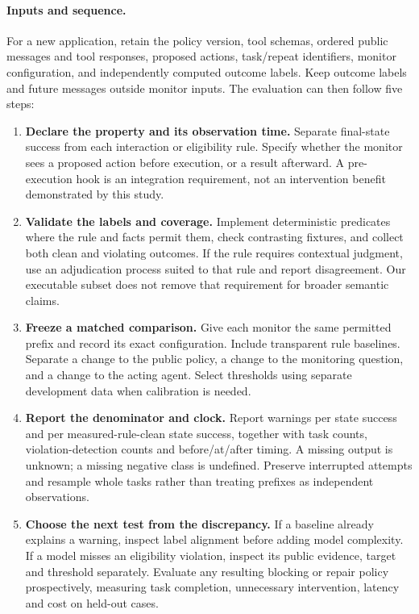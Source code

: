 \paragraph{Inputs and sequence.}
For a new application, retain the policy version, tool schemas, ordered public messages and tool responses, proposed actions, task/repeat identifiers, monitor configuration, and independently computed outcome labels. Keep outcome labels and future messages outside monitor inputs. The evaluation can then follow five steps:
\begin{enumerate}
\item \textbf{Declare the property and its observation time.} Separate final-state success from each interaction or eligibility rule. Specify whether the monitor sees a proposed action before execution, or a result afterward. A pre-execution hook is an integration requirement, not an intervention benefit demonstrated by this study.
\item \textbf{Validate the labels and coverage.} Implement deterministic predicates where the rule and facts permit them, check contrasting fixtures, and collect both clean and violating outcomes. If the rule requires contextual judgment, use an adjudication process suited to that rule and report disagreement. Our executable subset does not remove that requirement for broader semantic claims.
\item \textbf{Freeze a matched comparison.} Give each monitor the same permitted prefix and record its exact configuration. Include transparent rule baselines. Separate a change to the public policy, a change to the monitoring question, and a change to the acting agent. Select thresholds using separate development data when calibration is needed.
\item \textbf{Report the denominator and clock.} Report warnings per state success and per measured-rule-clean state success, together with task counts, violation-detection counts and before/at/after timing. A missing output is unknown; a missing negative class is undefined. Preserve interrupted attempts and resample whole tasks rather than treating prefixes as independent observations.
\item \textbf{Choose the next test from the discrepancy.} If a baseline already explains a warning, inspect label alignment before adding model complexity. If a model misses an eligibility violation, inspect its public evidence, target and threshold separately. Evaluate any resulting blocking or repair policy prospectively, measuring task completion, unnecessary intervention, latency and cost on held-out cases.
\end{enumerate}

